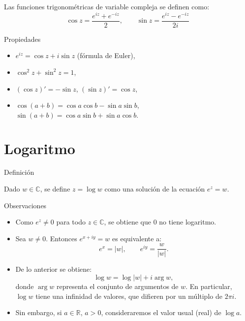 \documentclass[spanish,presentation]{beamer}
\begin{document}
\begin{frame}[label=sec-2-1]{}
\begin{definition}
Las funciones trigonométricas de variable compleja se definen
como:
\begin{displaymath}
\cos z=\frac{e^{iz}+e^{-iz}}{2},\qquad \sin z=\frac{e^{iz}-e^{-iz}}{2i}
\end{displaymath}
\end{definition}

\begin{block}{Propiedades}
\begin{itemize}
\item \(e^{iz}=\cos z+i\sin z\) (fórmula de Euler),
\item \(\cos^{2} z+\sin^{2}z=1\),
\item \((\cos z)'=-\sin z\), \((\sin z)'=\cos z\),
\item \(\cos(a+b)=\cos a\cos b-\sin a\sin b\), \(\sin(a+b)=\cos a\sin
      b+\sin a\cos b\).
\end{itemize}
\end{block}
\end{frame}

\section{Logaritmo}
\label{sec-3}

\begin{frame}[label=sec-3-1]{Definición}
\begin{definition}[Logaritmo]
Dado \(w\in \mathbb{C}\), se define \(z=\log w\) como una solución
de la ecuación \(e^{z}=w\).
\end{definition}
\end{frame}

\begin{frame}[label=sec-3-2]{}
\begin{block}{Observaciones}
\begin{itemize}
\item Como \(e^{z}\ne 0\) para todo \(z\in \mathbb{C}\), se obtiene
que \(0\) no tiene logaritmo.
\item Sea \(w\ne 0\). Entonces \(e^{x+iy}=w\) es equivalente a:
\begin{displaymath}
e^{x}=|w|,\qquad e^{iy}=\frac{w}{|w|}.
\end{displaymath}
\item De lo anterior se obtiene:
\begin{displaymath}
\log w = \log |w| +i\arg w,
\end{displaymath}
donde \(\arg w\) representa el conjunto de argumentos de
\(w\). En particular, \(\log w\) tiene una infinidad de valores,
que difieren por un múltiplo de \(2\pi i\).
\item Sin embargo, si \(a\in\mathbb{R}\), \(a>0\), consideraremos
el valor usual (real) de \(\log a\).
\end{itemize}
\end{block}
\end{frame}
\end{document}

